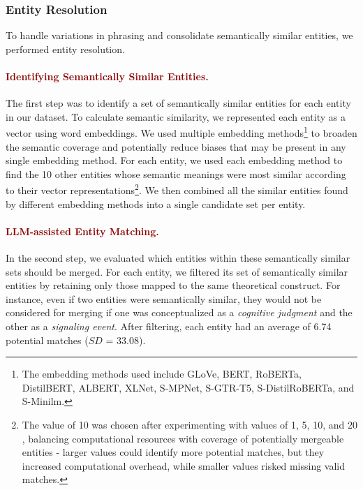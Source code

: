 \subsubsection{Entity Resolution}

To handle variations in phrasing and consolidate semantically similar entities, we performed entity resolution. 


\paragraph{\textcolor{darkred}{\textbf{Identifying Semantically Similar Entities.}}}
The first step was to identify a set of semantically similar entities for each entity in our dataset. 
To calculate semantic similarity, we represented each entity as a vector using word embeddings.
We used multiple embedding methods\footnote{The embedding methods used include GLoVe, BERT, RoBERTa, DistilBERT, ALBERT, XLNet, S-MPNet, S-GTR-T5, S-DistilRoBERTa, and S-Minilm.} to broaden the semantic coverage and potentially reduce biases \cite{embedding_bias_swinger_2019} that may be present in any single embedding method. 
For each entity, we used each embedding method to find the 10 other entities whose semantic meanings were most similar according to their vector representations\footnote{The value of 10 was chosen after experimenting with values of 1, 5, 10, and 20 \cite{entity_matching_2023}, balancing computational resources with coverage of potentially mergeable entities - larger values could identify more potential matches, but they increased computational overhead, while smaller values risked missing valid matches.}. 
We then combined all the similar entities found by different embedding methods into a single candidate set per entity.


\paragraph{\textcolor{darkred}{\textbf{LLM-assisted Entity Matching.}}}
In the second step, we evaluated which entities within these semantically similar sets should be merged. 
For each entity, we filtered its set of semantically similar entities by retaining only those mapped to the same theoretical construct.
For instance, even if two entities were semantically similar, they would not be considered for merging if one was conceptualized as a \textit{cognitive judgment} and the other as a \textit{signaling event}.
After filtering, each entity had an average of 6.74 potential matches ($SD$ = 33.08).

